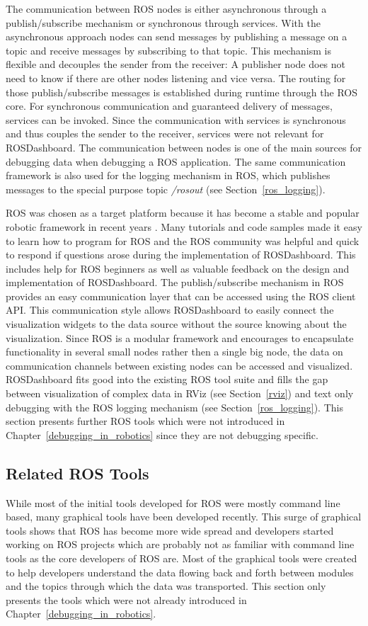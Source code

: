 The communication between ROS nodes is either asynchronous through a publish/subscribe mechanism or synchronous through services. With the asynchronous approach nodes can send messages by publishing a message on a topic and receive messages by subscribing to that topic. This mechanism is flexible and decouples the sender from the receiver: A publisher node does not need to know if there are other nodes listening and vice versa. The routing for those publish/subscribe messages is established during runtime through the ROS core. For synchronous communication and guaranteed delivery of messages, services can be invoked. Since the communication with services is synchronous and thus couples the sender to the receiver, services were not relevant for ROSDashboard. The communication between nodes is one of the main sources for debugging data when debugging a ROS application. The same communication framework is also used for the logging mechanism in ROS, which publishes messages to the special purpose topic \emph{/rosout} (see Section~\ref{ros_logging}).

ROS was chosen as a target platform because it has become a stable and popular robotic framework in recent years \cite{Foote2012}. Many tutorials and code samples made it easy to learn how to program for ROS and the ROS community was helpful and quick to respond if questions arose during the implementation of ROSDashboard. This includes help for ROS beginners as well as valuable feedback on the design and implementation of ROSDashboard. The publish/subscribe mechanism in ROS provides an easy communication layer that can be accessed using the ROS client API. This communication style allows ROSDashboard to easily connect the visualization widgets to the data source without the source knowing about the visualization. Since ROS is a modular framework and encourages to encapsulate functionality in several small nodes rather then a single big node, the data on communication channels between existing nodes can be accessed and visualized. ROSDashboard fits good into the existing ROS tool suite and fills the gap between visualization of complex data in RViz (see Section~\ref{rviz}) and text only debugging with the ROS logging mechanism (see Section~\ref{ros_logging}). This section presents further ROS tools which were not introduced in Chapter~\ref{debugging_in_robotics} since they are not debugging specific.

\subsection{Related ROS Tools}
While most of the initial tools developed for ROS were mostly command line based, many graphical tools have been developed recently. This surge of graphical tools shows that ROS has become more wide spread and developers started working on ROS projects which are probably not as familiar with command line tools as the core developers of ROS are. Most of the graphical tools were created to help developers understand the data flowing back and forth between modules and the topics through which the data was transported. This section only presents the tools which were not already introduced in Chapter~\ref{debugging_in_robotics}.

